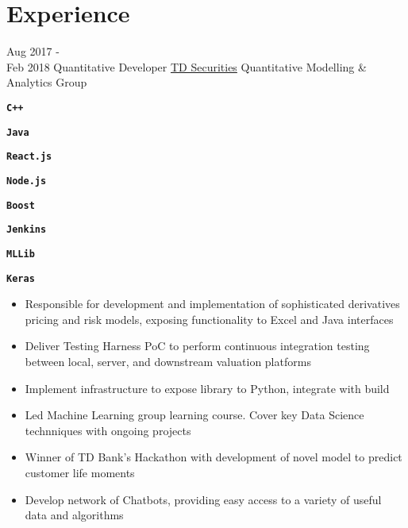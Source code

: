 \documentclass[letterpaper]{twentysecondcv} %
\begin{document}
\makeprofile %

\newcommand{\skill}[1]{\texttt{\textbf{#1}}}


\section{Experience}

\begin{twenty} %

	\twentyitem
    	{Aug 2017 - \\ Feb 2018}
        {Quantitative Developer}
        {\href{https://www.tdsecurities.com}{TD Securities}}
        {Quantitative Modelling \& Analytics Group}
        {
        \item\skill{C++}
        \item\skill{Java}
        \item
        \item\skill{React.js}
        \item\skill{Node.js}
        \item\skill{Boost}
        \item\skill{Jenkins}
		\item\skill{MLLib}
		\item\skill{Keras}
		}
        {\begin{itemize}
        \item Responsible for development and implementation of sophisticated derivatives pricing and risk models, exposing functionality to Excel and Java interfaces
        \item Deliver Testing Harness PoC to perform continuous integration testing between local, server, and downstream valuation platforms
        \item Implement infrastructure to expose library to Python, integrate with build
        \item Led Machine Learning group learning course. Cover key Data Science technniques with ongoing projects
        \item Winner of TD Bank's Hackathon with development of novel model to predict customer life moments
        \item Develop network of Chatbots, providing easy access to a variety of useful data and algorithms
    \end{itemize}	
    	}


\end{twenty}
\end{document}
